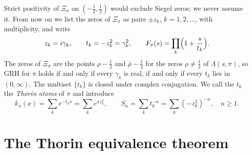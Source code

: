 Strict positivity of $\Xi_\pi$ on $(-\frac12,\frac12)$ would exclude Siegel zeros; we never assume it. From now on we list the zeros of $\Xi_\pi$ as pairs $\pm z_k$, $k = 1,2,\dots$, with multiplicity, and write
\begin{equation}\label{eq:10batoms}
z_k = i\gamma_k,\qquad t_k = -z_k^2 = \gamma_k^2,\qquad F_\pi(s) = \prod_k\Bigl(1+\frac s{t_k}\Bigr).
\end{equation}
The zeros of $\Xi_\pi$ are the points $\rho-\frac12$ and $\bar\rho-\frac12$ for the zeros $\rho\ne\frac12$ of $\Lambda(s,\pi)$, so GRH for $\pi$ holds if and only if every $\gamma_k$ is real, if and only if every $t_k$ lies in $(0,\infty)$. The multiset $\{t_k\}$ is closed under complex conjugation. We call the $t_k$ the \emph{Thorin atoms} of $\pi$ and introduce
\begin{equation}\label{eq:10bkS}
k_\pi(x) = \sum_ke^{-t_kx} = \sum_ke^{xz_k^2},\qquad S_n = \sum_kt_k^{-n} = \sum_k(-z_k^2)^{-n},\quad n\ge1.
\end{equation}

\section{The Thorin equivalence theorem}

